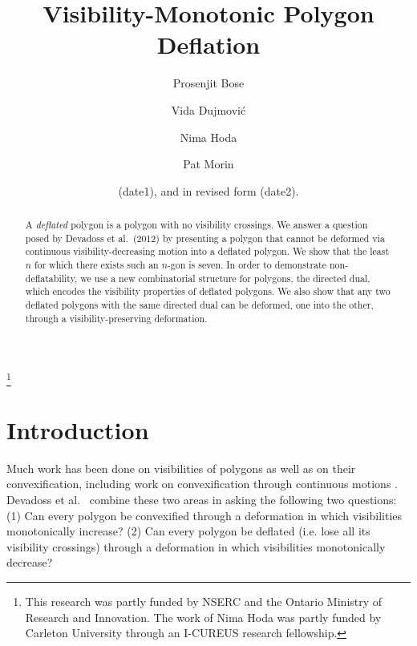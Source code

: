 \documentclass[11pt]{amsart}
\title{Visibility-Monotonic Polygon Deflation}%
\begin{document}
\author{Prosenjit Bose}
\address{School of Computer Science, Carleton University}

\author{Vida Dujmovi{\'c}}
\address{School of Computer Science and Electrical Engineering,
University of Ottawa}

\author{Nima Hoda}
\address{Department of Mathematics and Statistics, McGill University}

\author{Pat Morin} 
\address{School of Computer Science, Carleton University}

\date{(date1), and in revised form (date2).}
\thanks{This research was partly funded by NSERC and the Ontario Ministry
of Research and Innovation. The work of Nima Hoda was partly funded by
Carleton University through an I-CUREUS research fellowship.}



\maketitle

\begin{abstract}
  A \emph{deflated} polygon is a polygon with no visibility crossings.
  We answer a question posed by Devadoss et al.\ (2012) by presenting a
  polygon that cannot be deformed via continuous visibility-decreasing
  motion into a deflated polygon.  We show that the least $n$ for
  which there exists such an $n$-gon is seven. In order to demonstrate
  non-deflatability, we use a new combinatorial structure for polygons,
  the directed dual, which encodes the visibility properties of
  deflated polygons.  We also show that any two deflated polygons with
  the same directed dual can be deformed, one into the other, through
  a visibility-preserving deformation.
\end{abstract}

\section{Introduction}

Much work has been done on visibilities of polygons \cite{Ghosh07,
  ORourke87} as well as on their convexification, including work on
convexification through continuous motions \cite{Connely00}.  Devadoss
et al.\ \cite{Devadoss09} combine these two areas in asking the
following two questions: (1) Can every polygon be convexified through
a deformation in which visibilities monotonically increase?  (2) Can
every polygon be deflated (i.e. lose all its visibility crossings)
through a deformation in which visibilities monotonically decrease?
\end{document}
